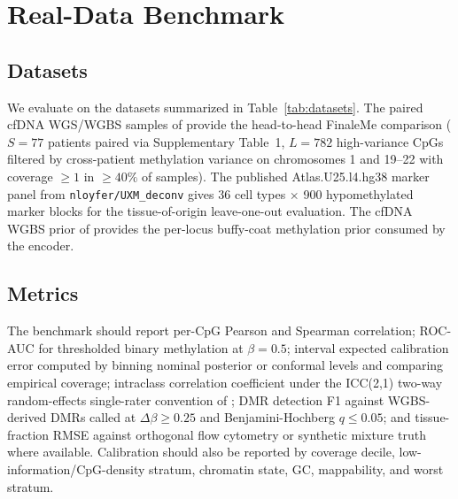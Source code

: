 \section{Real-Data Benchmark}
\label{sec:benchmark}

\subsection{Datasets}
We evaluate on the datasets summarized in Table~\ref{tab:datasets}. The paired cfDNA WGS/WGBS samples of \citet{liu2024finaleme} provide the head-to-head FinaleMe comparison ($S=77$ patients paired via Supplementary Table~1, $L=782$ high-variance CpGs filtered by cross-patient methylation variance on chromosomes 1 and 19--22 with coverage $\ge 1$ in $\ge 40\%$ of samples). The published Atlas.U25.l4.hg38 marker panel from \texttt{nloyfer/UXM\_deconv} \citep{loyfer2023} gives 36 cell types $\times$ 900 hypomethylated marker blocks for the tissue-of-origin leave-one-out evaluation. The cfDNA WGBS prior of \citet{jensen2015} provides the per-locus buffy-coat methylation prior consumed by the encoder.

\begin{table}[htbp]
\centering\small
\caption{Datasets used in the real-data benchmark. Sample and locus counts are the realized panel after manifest pairing and variance filtering.}
\label{tab:datasets}
\end{table}

\subsection{Metrics}
The benchmark should report per-CpG Pearson and Spearman correlation; ROC-AUC for thresholded binary methylation at $\beta=0.5$; interval expected calibration error computed by binning nominal posterior or conformal levels and comparing empirical coverage; intraclass correlation coefficient under the ICC(2,1) two-way random-effects single-rater convention of \citet{higginschen2022pcclocks}; DMR detection F1 against WGBS-derived DMRs called at $\Delta\beta\ge 0.25$ and Benjamini-Hochberg $q\le 0.05$; and tissue-fraction RMSE against orthogonal flow cytometry or synthetic mixture truth where available. Calibration should also be reported by coverage decile, low-information/CpG-density stratum, chromatin state, GC, mappability, and worst stratum.

